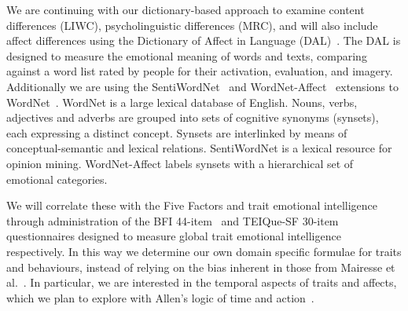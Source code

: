 \documentclass[letterpaper]{article}
\begin{document}
We are continuing with our dictionary-based approach to examine
content differences (LIWC), psycholinguistic differences (MRC), and
will also include affect differences using the Dictionary of Affect in
Language (DAL)~\cite{whissell:2008,whissell:2009}. The DAL is designed
to measure the emotional meaning of words and texts, comparing against
a word list rated by people for their activation, evaluation, and
imagery. Additionally we are using the
SentiWordNet~\cite{esuli+sebastiani:2006} and
WordNet-Affect~\cite{strapparava+valitutti:2004} extensions to
WordNet~\cite{miller:1995}. WordNet is a large lexical database of
English. Nouns, verbs, adjectives and adverbs are grouped into sets of
cognitive synonyms (synsets), each expressing a distinct
concept. Synsets are interlinked by means of conceptual-semantic and
lexical relations. SentiWordNet is a lexical resource for opinion
mining. WordNet-Affect labels synsets with a hierarchical set of
emotional categories.

We will correlate these with the Five Factors and trait emotional
intelligence~\cite{petrides+furnham:2001} through administration of
the BFI 44-item~\cite{john-et-al:1991} and TEIQue-SF 30-item
questionnaires designed to measure global trait emotional
intelligence~\cite{petrides+furnham:2006} respectively. In this way we
determine our own domain specific formulae for traits and behaviours,
instead of relying on the bias inherent in those from Mairesse et
al.~\cite{mairesse-et-al:2007}. In particular, we are interested in
the temporal aspects of traits and affects, which we plan to explore
with Allen's logic of time and action~\cite{allen:1983,allen:1984}.



\end{document}
